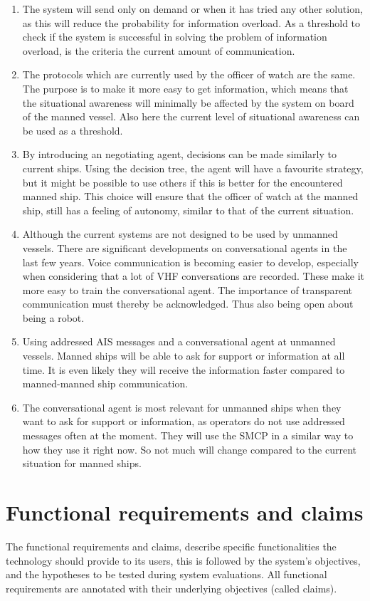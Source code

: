 \begin{enumerate}
	\item The system will send only on demand or when it has tried any other solution, as this will reduce the probability for information overload. As a threshold to check if the system is successful in solving the problem of information overload, is the criteria the current amount of communication.
	\item The protocols which are currently used by the officer of watch are the same. The purpose is to make it more easy to get information, which means that the situational awareness will minimally be affected by the system on board of the manned vessel. Also here the current level of situational awareness can be used as a threshold.
	\item By introducing an negotiating agent, decisions can be made similarly to current ships. Using the decision tree, the agent will have a favourite strategy, but it might be possible to use others if this is better for the encountered manned ship. This choice will ensure that the officer of watch at the manned ship, still has a feeling of autonomy, similar to that of the current situation. 
	\item Although the current systems are not designed to be used by unmanned vessels. There are significant developments on conversational agents in the last few years. Voice communication is becoming easier to develop, especially when considering that a lot of \ac{VHF} conversations are recorded. These make it more easy to train the conversational agent. The importance of transparent communication must thereby be acknowledged. Thus also being open about being a robot. 
	\item Using addressed \ac{AIS} messages and a conversational agent at unmanned vessels. Manned ships will be able to ask for support or information at all time. It is even likely they will receive the information faster compared to manned-manned ship communication.
	\item The conversational agent is most relevant for unmanned ships when they want to ask for support or information, as operators do not use addressed messages often at the moment. They will use the \ac{SMCP} in a similar way to how they use it right now. So not much will change compared to the current situation for manned ships.
\end{enumerate}

\section{Functional requirements and claims}
The functional requirements and claims, describe specific functionalities the technology should provide to its users, this is followed by the system’s objectives, and the hypotheses to be tested during system evaluations. All functional requirements are annotated with their underlying objectives (called claims).

